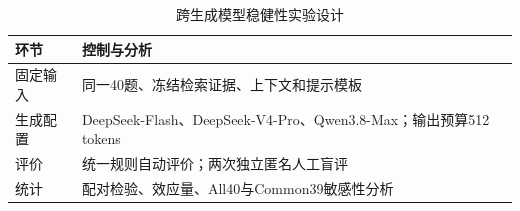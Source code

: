 \begin{table}[htbp]
\centering\footnotesize
\setlength{\tabcolsep}{4pt}
\caption{跨生成模型稳健性实验设计}
\label{tab:cm-design}
\begin{tabularx}{\linewidth}{lX}
\toprule
环节 & 控制与分析 \\
\midrule
固定输入 & 同一40题、冻结检索证据、上下文和提示模板 \\
生成配置 & DeepSeek-Flash、DeepSeek-V4-Pro、Qwen3.8-Max；输出预算512 tokens \\
评价 & 统一规则自动评价；两次独立匿名人工盲评 \\
统计 & 配对检验、效应量、All40与Common39敏感性分析 \\
\bottomrule
\end{tabularx}

\end{table}
